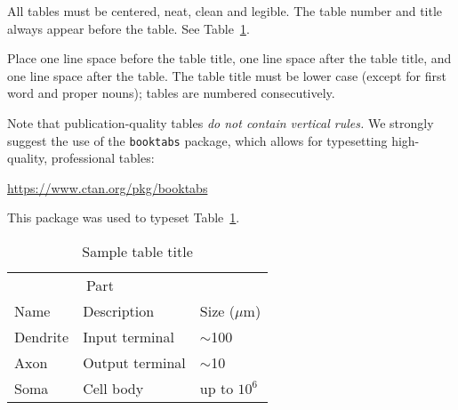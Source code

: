 \documentclass{article}
\begin{document}
All tables must be centered, neat, clean and legible.  The table number and
title always appear before the table.  See Table~\ref{sample-table}.


Place one line space before the table title, one line space after the
table title, and one line space after the table. The table title must
be lower case (except for first word and proper nouns); tables are
numbered consecutively.


Note that publication-quality tables \emph{do not contain vertical rules.} We
strongly suggest the use of the \verb+booktabs+ package, which allows for
typesetting high-quality, professional tables:
\begin{center}
  \url{https://www.ctan.org/pkg/booktabs}
\end{center}
This package was used to typeset Table~\ref{sample-table}.


\begin{table}
  \caption{Sample table title}
  \label{sample-table}
  \centering
  \begin{tabular}{lll}
    \toprule
    \multicolumn{2}{c}{Part}                   \\
    \cmidrule(r){1-2}
    Name     & Description     & Size ($\mu$m) \\
    \midrule
    Dendrite & Input terminal  & $\sim$100     \\
    Axon     & Output terminal & $\sim$10      \\
    Soma     & Cell body       & up to $10^6$  \\
    \bottomrule
  \end{tabular}
\end{table}



\end{document}
